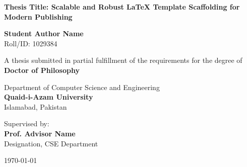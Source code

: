 \begin{titlepage}
\begin{center}
    \vspace*{1cm}
    
    
    \vspace{1.5cm}
    
    {\huge \bfseries \color{primary} Thesis Title: Scalable and Robust LaTeX Template Scaffolding for Modern Publishing}
    
    \vspace{1.5cm}
    
    {\Large \bfseries Student Author Name} \\
    \vspace{0.2cm}
    {Roll/ID: 1029384}
    
    \vspace{1.5cm}
    
    {A thesis submitted in partial fulfillment of the requirements for the degree of} \\
    \vspace{0.3cm}
    {\large \bfseries \color{secondary} Doctor of Philosophy}
    
    \vspace{1.5cm}
    
    {\large Department of Computer Science and Engineering} \\
    \vspace{0.2cm}
    {\large \bfseries \color{primary} Quaid-i-Azam University} \\
    \vspace{0.1cm}
    {Islamabad, Pakistan}
    
    \vfill
    
    {Supervised by:} \\
    {\large \bfseries Prof. Advisor Name} \\
    {Designation, CSE Department}
    
    \vspace{1cm}
    
    {\large \today}
    
\end{center}
\end{titlepage}
